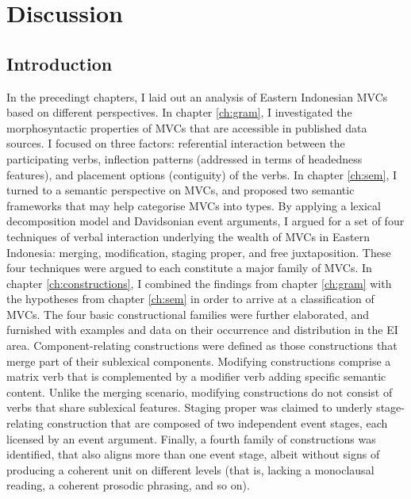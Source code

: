 \chapter{Discussion}\label{ch:discussion}
\section{Introduction}

In the precedingt chapters, I laid out an analysis of Eastern Indonesian MVCs based on different perspectives. In chapter \ref{ch:gram}, I investigated the morphosyntactic properties of MVCs that are accessible in published data sources. I focused on three factors: referential interaction between the participating verbs, inflection patterns (addressed in terms of headedness features), and placement options (contiguity) of the verbs. In chapter \ref{ch:sem}, I turned to a semantic perspective on MVCs, and proposed two semantic frameworks that may help categorise MVCs into types. By applying a lexical decomposition model and Davidsonian event arguments, I argued for a set of four techniques of verbal interaction underlying the wealth of MVCs in Eastern Indonesia: merging, modification, staging proper, and free juxtaposition. These four techniques were argued to each constitute a major family of MVCs. In chapter \ref{ch:constructions}, I combined the findings from chapter \ref{ch:gram} with the hypotheses from chapter \ref{ch:sem} in order to arrive at a classification of MVCs. The four basic constructional families were further elaborated, and furnished with examples and data on their occurrence and distribution in the EI area. Component-relating constructions were defined as those constructions that merge part of their sublexical components. Modifying constructions comprise a matrix verb that is complemented by a modifier verb adding specific semantic content. Unlike the merging scenario, modifying constructions do not consist of verbs that share sublexical features. Staging proper was claimed to underly stage-relating construction that are composed of two independent event stages, each licensed by an event argument. Finally, a fourth family of constructions was identified, that also aligns more than one event stage, albeit without signs of producing a coherent unit on different levels (that is, lacking a monoclausal reading, a coherent prosodic phrasing, and so on).

